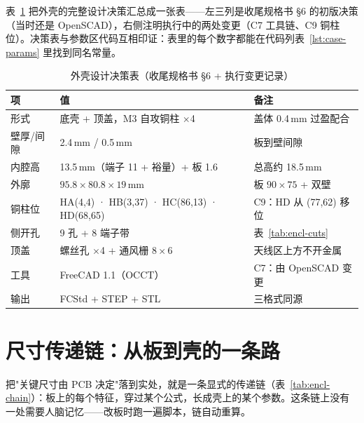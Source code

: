 表~\ref{tab:encl-spec} 把外壳的完整设计决策汇总成一张表——左三列是收尾规格书 \S6 的初版决策（当时还是 OpenSCAD），右侧注明执行中的两处变更（C7 工具链、C9 铜柱位）。决策表与参数区代码互相印证：表里的每个数字都能在代码列表~\ref{lst:case-params} 里找到同名常量。

\begin{table}[htbp]
  \centering
  \caption{外壳设计决策表（收尾规格书 \S6 + 执行变更记录）}
  \label{tab:encl-spec}
  \begin{tabular}{lp{5.2cm}p{3.6cm}}
    \toprule
    项 & 值 & 备注 \\
    \midrule
    形式 & 底壳 + 顶盖，M3 自攻铜柱 $\times$4 & 盖体 0.4\,mm 过盈配合 \\
    壁厚/间隙 & 2.4\,mm / 0.5\,mm & 板到壁间隙 \\
    内腔高 & 13.5\,mm（端子 11 + 裕量）+ 板 1.6 & 总高约 18.5\,mm \\
    外廓 & $95.8\times80.8\times19$\,mm & 板 $90\times75$ + 双壁 \\
    铜柱位 & HA(4,4) · HB(3,37) · HC(86,13) · HD(68,65) & C9：HD 从 (77,62) 移位 \\
    侧开孔 & 9 孔 + 8 端子带 & 表~\ref{tab:encl-cuts} \\
    顶盖 & 螺丝孔 $\times$4 + 通风栅 $8\times6$ & 天线区上方不开金属 \\
    工具 & FreeCAD 1.1（OCCT） & C7：由 OpenSCAD 变更 \\
    输出 & FCStd + STEP + STL & 三格式同源 \\
    \bottomrule
  \end{tabular}
\end{table}

\section{尺寸传递链：从板到壳的一条路}
\label{sec:encl-chain}

把"关键尺寸由 PCB 决定"落到实处，就是一条显式的传递链（表~\ref{tab:encl-chain}）：板上的每个特征，穿过某个公式，长成壳上的某个参数。这条链上没有一处需要人脑记忆——改板时跑一遍脚本，链自动重算。

